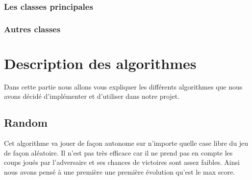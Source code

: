 \documentclass{report}
\begin{document}
			
			\subsection{Les classes principales}
			
	    \subsection{Autres classes}
	\chapter{Description des algorithmes}
	Dans cette partie nous allons vous expliquer les différents algorithmes que nous avons décidé d'implémenter et d'utiliser dans notre projet.
		\section{Random}
		Cet algorithme va jouer de façon autonome sur n'importe quelle case libre du jeu de façon aléatoire. Il n'est pas très efficace car il ne prend pas en compte les coups joués par l'adversaire et ses chances de victoires sont assez faibles. Ainsi nous avons pensé à une première une première évolution qu'est le max score.
\end{document}
